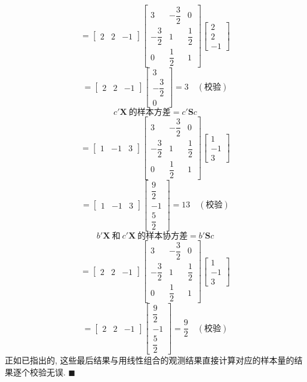\[
=\begin{bmatrix}2&2&-1\end{bmatrix}
\begin{bmatrix}
3&-\dfrac{3}{2}&0\\[2mm]
-\dfrac{3}{2}&1&\dfrac{1}{2}\\[2mm]
0&\dfrac{1}{2}&1
\end{bmatrix}
\begin{bmatrix}2\\2\\-1\end{bmatrix}
\]
\[
=\begin{bmatrix}2&2&-1\end{bmatrix}
\begin{bmatrix}3\\[1mm]-\dfrac{3}{2}\\[1mm]0\end{bmatrix}
=3 \quad(\text{校验})
\]
\[
c'\mathbf{X}\ \text{的样本方差}=c'\mathbf{S}c
\]
\[
=\begin{bmatrix}1&-1&3\end{bmatrix}
\begin{bmatrix}
3&-\dfrac{3}{2}&0\\[2mm]
-\dfrac{3}{2}&1&\dfrac{1}{2}\\[2mm]
0&\dfrac{1}{2}&1
\end{bmatrix}
\begin{bmatrix}1\\-1\\3\end{bmatrix}
\]
\[
=\begin{bmatrix}1&-1&3\end{bmatrix}
\begin{bmatrix}\dfrac{9}{2}\\[2mm]-1\\[2mm]\dfrac{5}{2}\end{bmatrix}
=13 \quad(\text{校验})
\]
\[
b'\mathbf{X}\ \text{和}\ c'\mathbf{X}\ \text{的样本协方差}=b'\mathbf{S}c
\]
\[
=\begin{bmatrix}2&2&-1\end{bmatrix}
\begin{bmatrix}
3&-\dfrac{3}{2}&0\\[2mm]
-\dfrac{3}{2}&1&\dfrac{1}{2}\\[2mm]
0&\dfrac{1}{2}&1
\end{bmatrix}
\begin{bmatrix}1\\-1\\3\end{bmatrix}
\]
\[
=\begin{bmatrix}2&2&-1\end{bmatrix}
\begin{bmatrix}\dfrac{9}{2}\\[2mm]-1\\[2mm]\dfrac{5}{2}\end{bmatrix}
=\frac{9}{2} \quad(\text{校验})
\]
正如已指出的, 这些最后结果与用线性组合的观测结果直接计算对应的样本量的结果逐个校验无误. \hfill$\blacksquare$

